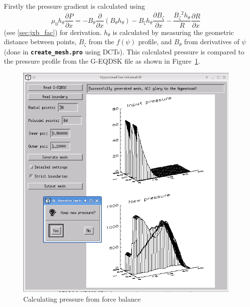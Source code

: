 \documentclass[12pt, a4paper]{article}
\newcommand{\file}[1]{\texttt{\bf #1}}
\newcommand{\deriv}[2]{\ensuremath{\frac{\partial #1}{\partial #2}}}
\newcommand{\hthe}{\ensuremath{h_\theta}}
\newcommand{\Bp}{\ensuremath{B_\theta}}
\newcommand{\Bt}{\ensuremath{B_\zeta}}
\begin{document}
\clearpage

Firstly the pressure gradient is calculated using 
\[
\mu_0\hthe\deriv{P}{x} = -\Bp\deriv{}{x}\left(\Bp\hthe\right) -\Bt\hthe\deriv{\Bt}{x} - \frac{\Bt^2\hthe}{R}\deriv{R}{x}
\]
(see \ref{sec:jxb_fac}) for derivation. $\hthe$ is calculated by measuring the
geometric distance between points, $\Bt$ from the $f\left(\psi\right)$ profile,
and $\Bp$ from derivatives of $\psi$ (done in \file{create\_mesh.pro} using DCTs). This calculated pressure is compared to the pressure profile from the
G-EQDSK file as shown in Figure~\ref{fig:screen_6}.
\begin{figure}[h!]
  \centering
  \includegraphics[width=0.5\paperwidth, keepaspectratio]{screen_6.png}
  \caption{Calculating pressure from force balance}
  \label{fig:screen_6}
\end{figure}
\end{document}
